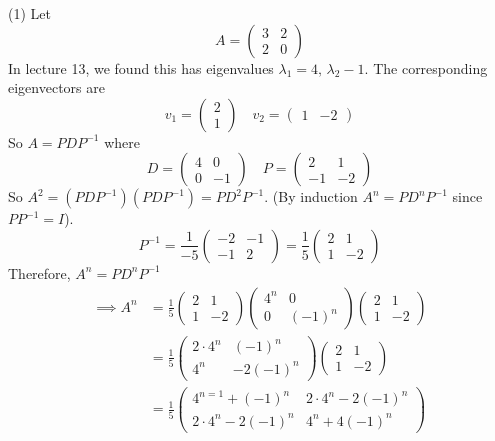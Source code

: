 \documentclass[10pt]{scrartcl}
\begin{document}
\begin{examples}
(1) Let 
\[
  A = \begin{pmatrix}
 3 & 2 \\ 2 & 0	
 \end{pmatrix}
\]
In lecture 13, we found this has eigenvalues $\lambda_1 = 4,\, \lambda_2 -1$. The corresponding eigenvectors are 
\[
  v_1 = \begin{pmatrix}
 2 \\ 1	
 \end{pmatrix} \quad v_2 = \begin{pmatrix}
 1 & -2	
 \end{pmatrix}
\]
So $A = PDP^{-1}$ where 
\[
  D = \begin{pmatrix}
  4 & 0 \\ 0 & -1
 \end{pmatrix}\quad 
 P = \begin{pmatrix}
 2 & 1 \\ -1 & -2	
 \end{pmatrix}
\]
So $A^2 = (PDP^{-1})(PDP^{-1}) = PD^2P^{-1}$. (By induction $A^n = PD^nP^{-1}$ since $PP^{-1} = I$). 
\[
  P^{-1} = \frac{1}{-5} \begin{pmatrix}
 -2 & -1\\ -1 & 2	
 \end{pmatrix}
 = \frac{1}{5}\begin{pmatrix}
2 & 1 \\ 1 & -2	
\end{pmatrix}
\]
Therefore, $A^n = PD^nP^{-1}$
\begin{align*}
  \implies A^n &= \frac{1}{5}\begin{pmatrix}
2 & 1\\ 1& -2	
\end{pmatrix}\begin{pmatrix}
4^n & 0 \\ 0 & (-1)^n	
\end{pmatrix}\begin{pmatrix}
2 & 1 \\ 1 & -2	
\end{pmatrix}\\[.2cm]
&= \frac{1}{5}\begin{pmatrix}
2\cdot 4^n & (-1)^n \\ 4^n & -2(-1)^n	
\end{pmatrix}\begin{pmatrix}
2 & 1\\ 1 & -2	
\end{pmatrix}\\[.2cm]
&= \frac{1}{5}\begin{pmatrix}
4^{n=1} + (-1)^n & 2\cdot 4^n - 2(-1)^n\\
2\cdot 4^n-2(-1)^n & 4^n+4(-1)^n	
\end{pmatrix}
\end{align*}


\end{examples}
\end{document}
